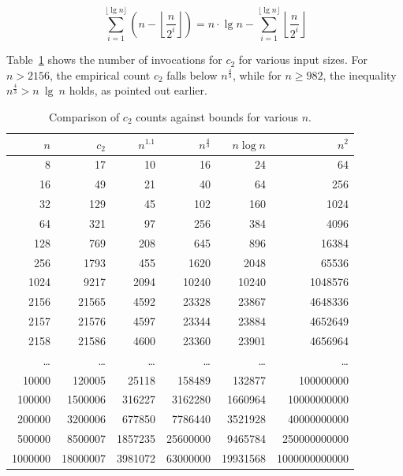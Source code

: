 \[
    \sum_{i=1}^{\lfloor \lg n \rfloor} \left( n - \left\lfloor \frac{n}{2^i} \right\rfloor \right)
    = n \cdot \lg n - \sum_{i=1}^{\lfloor \lg n \rfloor} \left\lfloor \frac{n}{2^i} \right\rfloor
\]

\noindent
Table~\ref{tab:counts} shows the number of invocations for $c_2$ for various input sizes.
For $n > 2156$, the empirical count $c_2$ falls below $n^\frac{4}{3}$, while for $n \geq 982$, the inequality $n^\frac{4}{3} > n\ \lg\ n$ holds, as pointed out earlier.


\begin{table}[h!]
    \centering
    \begin{tabular}{r|r|r|r|r|r}

        \textbf{$n$} & \textbf{$c_2$} & \textbf{$n^{1.1}$} & \textbf{$n^{\frac{4}{3}}$} & \textbf{$n \log n$} & \textbf{$n^2$} \\
        \hline
        8     & 17     & 10     & 16     & 24     & 64      \\
        16    & 49     & 21     & 40     & 64     & 256     \\
        32    & 129    & 45     & 102    & 160    & 1024    \\
        64    & 321    & 97     & 256    & 384    & 4096    \\
        128   & 769    & 208    & 645    & 896    & 16384   \\
        256   & 1793   & 455    & 1620   & 2048   & 65536   \\
        1024  & 9217   & 2094   & 10240  & 10240  & 1048576 \\
        2156  & 21565  & 4592   & 23328  & 23867  & 4648336 \\
        2157  & 21576  & 4597   & 23344  & 23884  & 4652649 \\
        2158  & 21586  & 4600   & 23360  & 23901  & 4656964 \\
        \ldots & \ldots & \ldots & \ldots & \ldots & \ldots \\
        10000 & 120005 & 25118  & 158489 & 132877 & 100000000 \\
        100000 & 1500006 & 316227 & 3162280 & 1660964 & 10000000000 \\
        200000 & 3200006 & 677850 & 7786440 & 3521928 & 40000000000 \\
        500000 & 8500007 & 1857235 & 25600000 & 9465784 & 250000000000 \\
        1000000 & 18000007 & 3981072 & 63000000 & 19931568 & 1000000000000 \\
        \hline
    \end{tabular}
    \smallskip
    \caption{Comparison of $c_2$ counts against bounds for various $n$.}
    \label{tab:counts}
\end{table}

